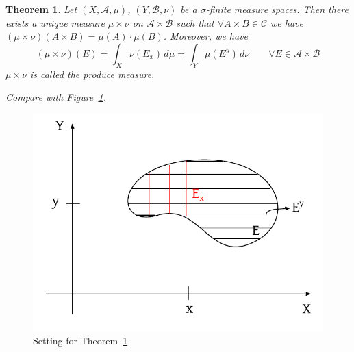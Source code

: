 \documentclass{article}
\newtheorem{theorem}{Theorem}  \numberwithin{theorem}{section}
\begin{document}
\begin{theorem}  %
  \label{thm:two}
  Let $(X, \mathcal A, \mu)$, $(Y, \mathcal B, \nu)$ be a $\sigma$-finite measure spaces. Then there exists a unique measure $\mu \times \nu$ on $\mathcal A \times \mathcal B$ such that
  $\forall A \times B \in \mathcal C$ we have $(\mu \times \nu)(A \times B) = \mu(A) \cdot \mu(B)$. Moreover, we have
  \[ (\mu \times \nu)(E) = \int_X \nu(E_x) \, d\mu = \int_Y \mu(E^y) \, d\nu  \qquad \forall E \in \mathcal A \times \mathcal B \]
  $\mu \times \nu$ is called the produce measure.

  Compare with Figure~\ref{img:24}.
\end{theorem}
\begin{figure}[!h]
  \begin{center}
    \includegraphics{img/24.pdf}
    \caption{Setting for Theorem~\ref{thm:two}}
    \label{img:24}  \end{center}
\end{figure}
\end{document}
